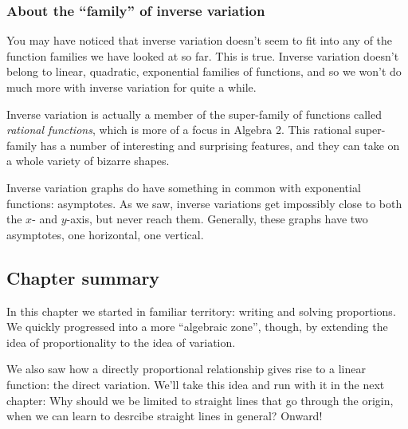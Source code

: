 \subsubsection{About the ``family'' of inverse variation}

You may have noticed that inverse variation doesn't seem to fit into any of the function families we have looked at so far. This is true. Inverse variation doesn't belong to linear, quadratic, exponential families of functions, and so we won't do much more with inverse variation for quite a while.

Inverse variation is actually a member of the super-family of functions called \textit{rational functions}, which is more of a focus in Algebra 2. This rational super-family has a number of interesting and surprising features, and they can take on a whole variety of bizarre shapes.

Inverse variation graphs do have something in common with exponential functions: asymptotes. As we saw, inverse variations get impossibly close to both the $x$- and $y$-axis, but never reach them. Generally, these graphs have two asymptotes, one horizontal, one vertical.

\subsection*{Chapter summary}

In this chapter we started in familiar territory: writing and solving proportions. We quickly progressed into a more ``algebraic zone'', though, by extending the idea of proportionality to the idea of variation.

We also saw how a directly proportional relationship gives rise to a linear function: the direct variation. We'll take this idea and run with it in the next chapter: Why should we be limited to straight lines that go through the origin, when we can learn to desrcibe straight lines in general? Onward!
